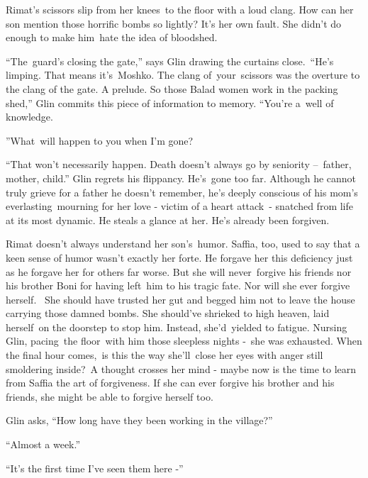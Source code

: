 \documentclass[letterpaper]{article}
\begin{document}
Rimat's scissors slip from her knees\ to the floor with a loud clang. How can her son mention those horrific bombs so
lightly? It's her own fault. She didn't do enough to make him\ hate the idea of bloodshed.

{}``The~guard{}'s closing the gate,{}'' says Glin drawing the curtains close.\ {}``He's limping. That means
it's\ Moshko. The clang of~your~scissors was the overture to the clang of the gate. A prelude. So those Balad women
work in the packing shed,{}'' Glin commits this piece of information to memory. ``You're a~well of
knowledge.{\textquotedbl}

{}''What\ will happen to you when I'm gone?{\textquotedbl}\ 

{}``That won't necessarily happen. Death doesn't always go by seniority --\ father, mother, child.'' Glin regrets his
flippancy. He{}'s\ gone too far. Although he cannot truly grieve for a father he doesn't remember, he{}'s deeply
conscious of his mom{}'s everlasting\ mourning for her love -  victim of a heart attack\ {}- snatched from life at its
most dynamic. He steals a glance at her. He{}'s already been forgiven.

\textcolor[rgb]{0.13333334,0.13333334,0.13333334}{Rimat doesn't always understand her son's~humor. Saffia, too, used to
say that a keen sense of humor wasn't exactly her forte. }He forgave her this deficiency just as he forgave her for
others far worse. But she will never\ forgive his friends nor his brother Boni for having left~him to his tragic fate.
Nor will she ever forgive herself.~ She should have trusted her gut and begged him not to leave the house carrying
those damned bombs. She should've shrieked to high heaven, laid herself\ on the doorstep to stop him. Instead,
she'd~yielded to fatigue. Nursing Glin, pacing\ the floor\ with him those sleepless nights -\ she was exhausted. When
the final hour comes,\ is this the way she'll\ close her eyes with anger still smoldering inside?\ A thought crosses
her mind - maybe now is the time to learn from Saffia the art of forgiveness. If she can ever forgive his brother
and\textcolor[rgb]{0.13333334,0.13333334,0.13333334}{ his friends, she might be able to forgive herself too. }

\textcolor[rgb]{0.13333334,0.13333334,0.13333334}{Glin asks, ``How long have they been working in the village?'' }

\textcolor[rgb]{0.13333334,0.13333334,0.13333334}{{}``Almost a week.'' }

\textcolor[rgb]{0.13333334,0.13333334,0.13333334}{{}``It's the first time I've seen them here -{}'' }
\end{document}
